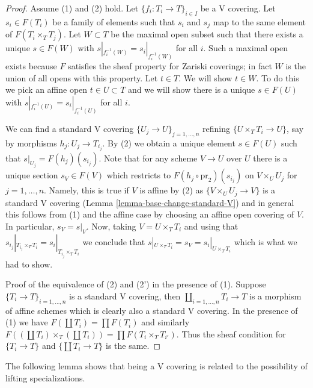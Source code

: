 \begin{proof}
Assume (1) and (2) hold.
Let $\{f_i : T_i \to T\}_{i \in I}$ be a V covering. Let $s_i \in F(T_i)$
be a family of elements such that $s_i$ and $s_j$ map to the same element
of $F(T_i \times_T T_j)$. Let $W \subset T$ be the maximal open subset
such that there exists a unique $s \in F(W)$ with
$s|_{f_i^{-1}(W)} = s_i|_{f_i^{-1}(W)}$ for all $i$.
Such a maximal open exists because $F$ satisfies the
sheaf property for Zariski coverings; in fact $W$ is the
union of all opens with this property. Let $t \in T$.
We will show $t \in W$. To do this we pick an affine open
$t \in U \subset T$ and we will show there is a unique
$s \in F(U)$ with
$s|_{f_i^{-1}(U)} = s_i|_{f_i^{-1}(U)}$ for all $i$.

\medskip\noindent
We can find a standard V covering
$\{U_j \to U\}_{j = 1, \ldots, n}$ refining $\{U \times_T T_i \to U\}$,
say by morphisms $h_j : U_j \to T_{i_j}$. By (2) we obtain a unique element
$s \in F(U)$ such that $s|_{U_j} = F(h_j)(s_{i_j})$. Note that for any
scheme $V \to U$ over $U$ there is a unique section $s_V \in F(V)$
which restricts to $F(h_j \circ \text{pr}_2)(s_{i_j})$ on
$V \times_U U_j$ for $j = 1, \ldots, n$. Namely, this is true if $V$
is affine by (2) as $\{V \times_U U_j \to V\}$ is a standard V covering
(Lemma \ref{lemma-base-change-standard-V})
and in general this follows from (1) and the affine case by choosing an
affine open covering of $V$. In particular, $s_V = s|_V$.
Now, taking $V = U \times_T T_i$ and using that
$s_{i_j}|_{T_{i_j} \times_T T_i} = s_i|_{T_{i_j} \times_T T_i}$
we conclude that $s|_{U \times_T T_i} = s_V = s_i|_{U \times_T T_i}$
which is what we had to show.

\medskip\noindent
Proof of the equivalence of (2) and (2') in the presence of (1).
Suppose $\{T_i \to T\}_{i = 1, \ldots, n}$ is a standard V covering, then
$\coprod_{i = 1, \ldots, n} T_i \to T$ is a morphism of affine schemes
which is clearly also a standard V covering.
In the presence of (1) we have $F(\coprod T_i) = \prod F(T_i)$
and similarly
$F((\coprod T_i) \times_T (\coprod T_i)) = \prod F(T_i \times_T T_{i'})$.
Thus the sheaf condition for $\{T_i \to T\}$ and $\{\coprod T_i \to T\}$
is the same.
\end{proof}

\noindent
The following lemma shows that being a V covering is
related to the possibility of lifting specializations.

